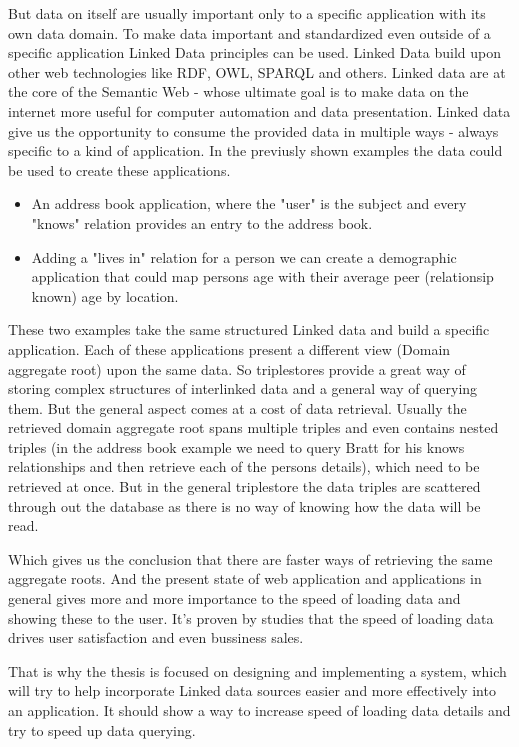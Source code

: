 But data on itself are usually important only to a specific application with its own data domain. To make data important and standardized even outside of a specific application Linked Data principles can be used. Linked Data build upon other web technologies like RDF, OWL, SPARQL and others. Linked data are at the core of the Semantic Web - whose ultimate goal is to make data on the internet more useful for computer automation and data presentation. Linked data give us the opportunity to consume the provided data in multiple ways - always specific to a kind of application. 
In the previusly shown examples the data could be used to create these applications.
\begin{itemize}
	\item An address book application, where the "user" is the subject and every "knows" relation provides an entry to the address book. 
	\item Adding a "lives in" relation for a person we can create a demographic application that could map persons age with their average peer (relationsip known) age by location. 
\end{itemize}
These two examples take the same structured Linked data and build a specific application. Each of these applications present a different view (Domain aggregate root) upon the same data.
So triplestores provide a great way of storing complex structures of interlinked data and a general way of querying them. But the general aspect comes at a cost of data retrieval. Usually the retrieved domain aggregate root spans multiple triples and even contains nested triples (in the address book example we need to query Bratt for his knows relationships and then retrieve each of the persons details), which need to be retrieved at once. But in the general triplestore the data triples are scattered through out the database as there is no way of knowing how the data will be read.

Which gives us the conclusion that there are faster ways of retrieving the same aggregate roots. And the present state of web application and applications in general gives more and more importance to the speed of loading data and showing these to the user. It's proven by studies \cite{onlineSixRevisionsSpeed, onlineWebSiteOptimizationSpeed} that the speed of loading data drives user satisfaction and even bussiness sales.

That is why the thesis is focused on designing and implementing a system, which will try to help incorporate Linked data sources easier and more effectively into an application. It should show a way to increase speed of loading data details and try to speed up data querying.